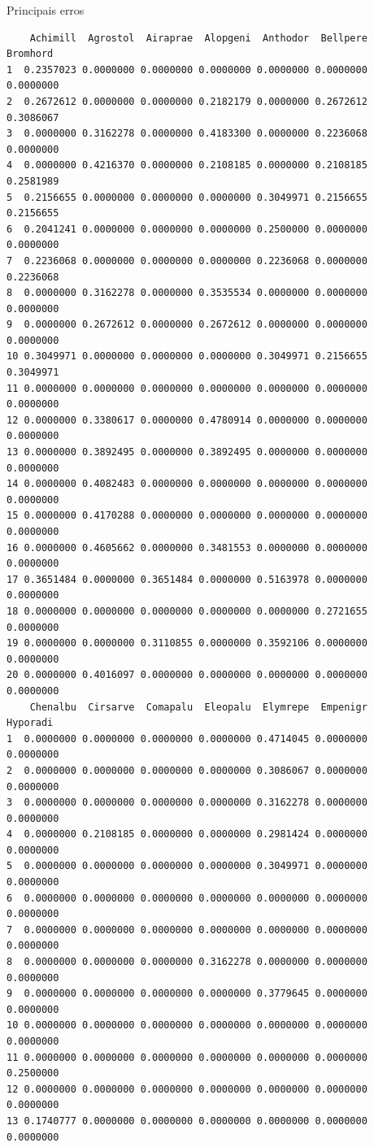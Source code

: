\documentclass[
  ignorenonframetext,
]{beamer}
\begin{document}
\begin{frame}[fragile]{}
\begin{block}{Principais erros}
\begin{verbatim}
    Achimill  Agrostol  Airaprae  Alopgeni  Anthodor  Bellpere  Bromhord
1  0.2357023 0.0000000 0.0000000 0.0000000 0.0000000 0.0000000 0.0000000
2  0.2672612 0.0000000 0.0000000 0.2182179 0.0000000 0.2672612 0.3086067
3  0.0000000 0.3162278 0.0000000 0.4183300 0.0000000 0.2236068 0.0000000
4  0.0000000 0.4216370 0.0000000 0.2108185 0.0000000 0.2108185 0.2581989
5  0.2156655 0.0000000 0.0000000 0.0000000 0.3049971 0.2156655 0.2156655
6  0.2041241 0.0000000 0.0000000 0.0000000 0.2500000 0.0000000 0.0000000
7  0.2236068 0.0000000 0.0000000 0.0000000 0.2236068 0.0000000 0.2236068
8  0.0000000 0.3162278 0.0000000 0.3535534 0.0000000 0.0000000 0.0000000
9  0.0000000 0.2672612 0.0000000 0.2672612 0.0000000 0.0000000 0.0000000
10 0.3049971 0.0000000 0.0000000 0.0000000 0.3049971 0.2156655 0.3049971
11 0.0000000 0.0000000 0.0000000 0.0000000 0.0000000 0.0000000 0.0000000
12 0.0000000 0.3380617 0.0000000 0.4780914 0.0000000 0.0000000 0.0000000
13 0.0000000 0.3892495 0.0000000 0.3892495 0.0000000 0.0000000 0.0000000
14 0.0000000 0.4082483 0.0000000 0.0000000 0.0000000 0.0000000 0.0000000
15 0.0000000 0.4170288 0.0000000 0.0000000 0.0000000 0.0000000 0.0000000
16 0.0000000 0.4605662 0.0000000 0.3481553 0.0000000 0.0000000 0.0000000
17 0.3651484 0.0000000 0.3651484 0.0000000 0.5163978 0.0000000 0.0000000
18 0.0000000 0.0000000 0.0000000 0.0000000 0.0000000 0.2721655 0.0000000
19 0.0000000 0.0000000 0.3110855 0.0000000 0.3592106 0.0000000 0.0000000
20 0.0000000 0.4016097 0.0000000 0.0000000 0.0000000 0.0000000 0.0000000
    Chenalbu  Cirsarve  Comapalu  Eleopalu  Elymrepe  Empenigr  Hyporadi
1  0.0000000 0.0000000 0.0000000 0.0000000 0.4714045 0.0000000 0.0000000
2  0.0000000 0.0000000 0.0000000 0.0000000 0.3086067 0.0000000 0.0000000
3  0.0000000 0.0000000 0.0000000 0.0000000 0.3162278 0.0000000 0.0000000
4  0.0000000 0.2108185 0.0000000 0.0000000 0.2981424 0.0000000 0.0000000
5  0.0000000 0.0000000 0.0000000 0.0000000 0.3049971 0.0000000 0.0000000
6  0.0000000 0.0000000 0.0000000 0.0000000 0.0000000 0.0000000 0.0000000
7  0.0000000 0.0000000 0.0000000 0.0000000 0.0000000 0.0000000 0.0000000
8  0.0000000 0.0000000 0.0000000 0.3162278 0.0000000 0.0000000 0.0000000
9  0.0000000 0.0000000 0.0000000 0.0000000 0.3779645 0.0000000 0.0000000
10 0.0000000 0.0000000 0.0000000 0.0000000 0.0000000 0.0000000 0.0000000
11 0.0000000 0.0000000 0.0000000 0.0000000 0.0000000 0.0000000 0.2500000
12 0.0000000 0.0000000 0.0000000 0.0000000 0.0000000 0.0000000 0.0000000
13 0.1740777 0.0000000 0.0000000 0.0000000 0.0000000 0.0000000 0.0000000

\end{verbatim}
\end{block}
\end{frame}
\end{document}
